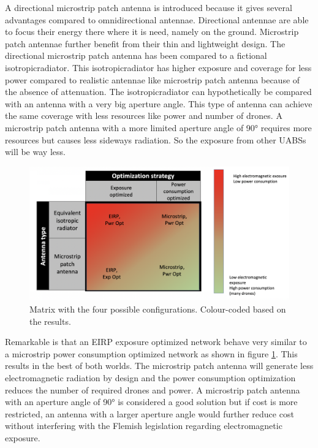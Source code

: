 A directional microstrip patch antenna is introduced because it gives several advantages compared to omnidirectional antennae.
Directional antennae are able to focus their energy there where it is need, namely on the ground. Microstrip patch antennae 
further benefit from their thin and lightweight design. The directional microstrip patch antenna has been compared to a 
fictional \gls{isotropicradiator}.
This \gls{isotropicradiator} has higher exposure and coverage for less power compared to realistic antennae like microstrip patch antenna
because of the absence of attenuation.
The \gls{isotropicradiator} can hypothetically be compared with an antenna with a very big aperture angle.
This type of antenna can achieve the same coverage with less
resources like power and number of drones. 
A microstrip patch antenna  with a more limited aperture angle of \ang{90} requires more resources but 
causes less sideways radiation. So the exposure from other \gls{UABS}s will be way less.

\begin{figure}[hb!]
  \includegraphics[width=\textwidth]{../images/fourCasesMatrixSol.png}
  \caption{Matrix with the four possible configurations. Colour-coded based on the results.}
  \label{fig:resultIllustration}
\end{figure}

Remarkable is that an \gls{EIRP} exposure optimized network behave very similar to a microstrip power consumption optimized network as shown 
in figure \ref{fig:resultIllustration}.
This results in the best of both worlds. 
The microstrip patch antenna will generate less electromagnetic radiation by design and
 the power consumption optimization reduces the number of required drones and power. A microstrip patch antenna with an aperture 
 angle of \ang{90} is considered a good solution but if cost is more restricted, an antenna with a larger aperture angle 
 would further reduce cost without interfering with the Flemish legislation regarding electromagnetic exposure.


